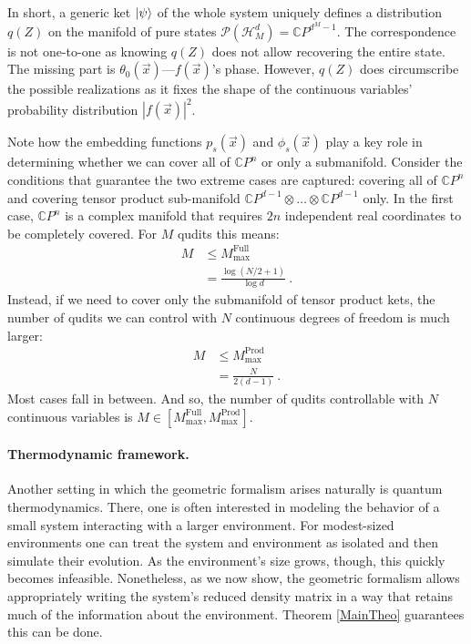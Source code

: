 \documentclass[draft,nofootinbib,pre,twocolumn,showpacs,showkeys,preprintnumbers,floatfix]{revtex4-1}
\newcommand{\1}{\mathbbm{1}}
\begin{document}
In short, a generic ket $\ket{\psi}$ of the whole system uniquely
defines a distribution $q(Z)$ on the manifold of pure states
$\mathcal{P}(\mathcal{H}_{M}^d) = \mathbb{C}P^{d^M-1}$. The correspondence is
not one-to-one as knowing $q(Z)$ does not allow recovering the entire
state. The missing part is $\theta_0(\vec{x})$---$f(\vec{x})$'s phase.
However, $q(Z)$ does circumscribe the possible realizations as it fixes the
shape of the continuous variables' probability distribution $|f(\vec{x})|^2$.

Note how the embedding functions $p_s(\vec{x})$ and $\phi_s(\vec{x})$ play a
key role in determining whether we can cover all of $\mathbb{C}P^n$ or only
a submanifold. Consider the conditions that guarantee the two extreme cases are
captured: covering all of $\mathbb{C}P^n$ and covering tensor product sub-manifold
$\mathbb{C}P^{d-1} \otimes \ldots \otimes \mathbb{C}P^{d-1}$ only. In the first
case, $\mathbb{C}P^n$ is a complex manifold that requires $2n$ independent real 
coordinates to be completely covered. For $M$ qudits this means:
\begin{align*}
M & \leq M^{\mathrm{Full}}_{\max} \\
  & = \frac{\log \left(N/2 + 1\right)}{\log d}
  ~.
\end{align*}
Instead, if we need to cover only the submanifold of tensor product kets, the
number of qudits we can control with $N$ continuous degrees of freedom is much
larger:
\begin{align*}
M & \leq M^{\mathrm{Prod}}_{\max} \\
  & = \frac{N}{2(d-1)}
  ~.
\end{align*}
Most cases fall in between. And so, the number of qudits controllable with $N$
continuous variables is $M \in \left[M^{\mathrm{Full}}_{\max},
M^{\mathrm{Prod}}_{\max}\right]$.

\paragraph*{Thermodynamic framework.}
Another setting in which the geometric formalism arises naturally is quantum
thermodynamics. There, one is often interested in modeling the behavior of a
small system interacting with a larger environment. For modest-sized
environments one can treat the system and environment as isolated and
then simulate their evolution. As the environment's size grows, though, this
quickly becomes infeasible. Nonetheless, as we now show, the geometric
formalism allows appropriately writing the system's reduced density matrix in a
way that retains much of the information about the environment. Theorem
\ref{MainTheo} guarantees this can be done.
\end{document}
